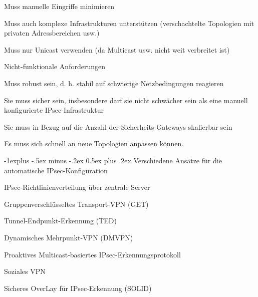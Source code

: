 \documentclass[a4paper]{article}
\makeatletter
\renewcommand{\subsection}{\@startsection{subsection}{2}{0mm}%
 {-1explus -.5ex minus -.2ex}%
 {0.5ex plus .2ex}%
 {\normalfont\normalsize\bfseries}}
\makeatother
\begin{document}
\begin{multicols}{3}
\begin{itemize*}
\begin{itemize*}
                  \begin{itemize*}
                        \item Muss manuelle Eingriffe minimieren
                        \item Muss auch komplexe Infrastrukturen unterstützen (verschachtelte Topologien mit privaten Adressbereichen usw.)
                        \item Muss nur Unicast verwenden (da Multicast usw. nicht weit verbreitet ist)
                  \end{itemize*}
                  \item
                  Nicht-funktionale Anforderungen

                  \begin{itemize*}
                        \item Muss robust sein, d. h. stabil auf schwierige Netzbedingungen reagieren
                        \item Sie muss sicher sein, insbesondere darf sie nicht schwächer sein als eine manuell konfigurierte IPsec-Infrastruktur
                        \item Sie muss in Bezug auf die Anzahl der Sicherheits-Gateways skalierbar sein
                        \item Es muss sich schnell an neue Topologien anpassen können.
                  \end{itemize*}
            \end{itemize*}


            \subsection{Verschiedene Ansätze für die automatische
                  IPsec-Konfiguration}

            \begin{itemize*}
                  \item
                  IPsec-Richtlinienverteilung über zentrale Server
                  \item
                  Gruppenverschlüsseltes Transport-VPN (GET)
                  \item
                  Tunnel-Endpunkt-Erkennung (TED)
                  \item
                  Dynamisches Mehrpunkt-VPN (DMVPN)
                  \item
                  Proaktives Multicast-basiertes IPsec-Erkennungsprotokoll
                  \item
                  Soziales VPN
                  \item
                  Sicheres OverLay für IPsec-Erkennung (SOLID)
            \end{itemize*}



\end{itemize*}
\end{multicols}
\end{document}

